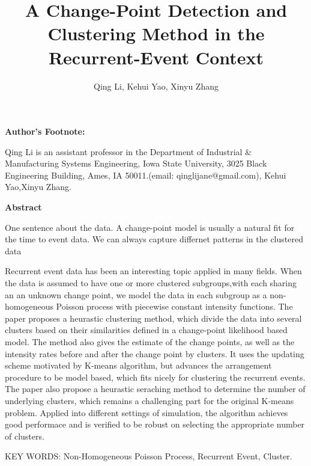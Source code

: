\documentclass[12pt]{article}
\begin{document}
\title{A Change-Point Detection and Clustering Method in the Recurrent-Event Context}
\author{Qing Li, Kehui Yao, Xinyu Zhang}
\date{}
\maketitle
\newpage
\mbox{} \vspace*{2in}
\begin{center}
\textbf{Author's Footnote:}
\end{center}
Qing Li is an assistant professor in the Department of Industrial \& Manufacturing Systems Engineering, Iowa State University, 3025 Black Engineering Building, Ames, IA 50011.(email: qinglijane@gmail.com), Kehui Yao,Xinyu Zhang.




\newpage

\begin{center}
\textbf{Abstract}

\end{center}
One sentence about the data. A change-point model is usually a natural fit for the time to event data. We can always capture differnet patterns in the clustered data


Recurrent event data has been an interesting topic applied in many fields. When the data is assumed to have one or more clustered subgroups,with each sharing an an unknown change point, we model the data in each subgroup as a non-homogeneous Poisson process with piecewise constant intensity functions. The paper proposes a heurastic clustering method, which divide the data into several clusters based on their similarities defined in a change-point likelihood based model. The method also gives the estimate of the change points, as well as the intensity rates before and after the change point by clusters. It uses the updating scheme motivated by K-means algorithm, but advances the arrangement procedure to be model based, which fits nicely for clustering the recurrent events. The paper also propose a heurastic seraching method to determine the number of underlying clusters, which remains a challenging part for the original K-means problem. Applied into different settings of simulation, the algorithm achieves good performace and is verified to be robust on selecting the appropriate number of clusters. 

\vspace*{.3in}

\noindent KEY WORDS: {Non-Homogeneous Poisson Process, Recurrent Event, Cluster.}
\end{document}
